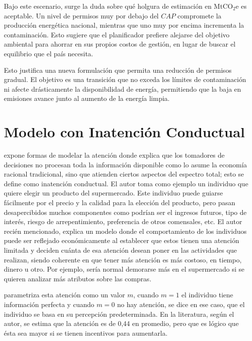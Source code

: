 Bajo este escenario, surge la duda sobre qué holgura de estimación en MtCO$_2$e  es aceptable. Un nivel de permisos muy por debajo del $CAP$ compromete la producción energética nacional, mientras que uno muy por encima incrementa la contaminación. Esto sugiere que el planificador prefiere alejarse del objetivo ambiental para ahorrar en sus propios costos de gestión, en lugar de buscar el equilibrio que el país necesita. \medskip

Esto justifica una nueva formulación que permita una reducción de permisos gradual. El objetivo es una transición que no exceda los límites de contaminación ni afecte drásticamente la disponibilidad de energía, permitiendo que la baja en emisiones avance junto al aumento de la energía limpia.\medskip

\section{Modelo con Inatención Conductual}
\label{atencionconductual}
 expone formas de modelar la atención donde explica que los tomadores de decisiones no procesan toda la información disponible como lo asume la economía racional tradicional, sino que atienden ciertos aspectos del espectro total; esto se define como inatención conductual. El autor toma como ejemplo un individuo que quiere elegir un producto del supermercado. Este individuo puede guiarse fácilmente por el precio y la calidad para la elección del producto, pero pasan desapercibidos muchos componentes como podrían ser el ingresos futuros, tipo de interés, riesgo de arrepentimiento, preferencia de otros comensales, etc. El autor recién mencionado, explica un modelo donde el comportamiento de los individuos puede ser reflejado económicamente al establecer que estos tienen una atención limitada y deciden cuánta de esa atención desean poner en las actividades que realizan, siendo coherente en que tener más atención es más costoso, en tiempo, dinero u otro. Por ejemplo, sería normal demorarse más en el supermercado si se quieren analizar más atributos sobre las compras.\medskip

 parametriza esta atención como un valor $m$, cuando $m=1$ el individuo tiene información perfecta y cuando $m=0$ no hay atención, se dice en ese caso, que el individuo se basa en su percepción predeterminada. En la literatura, según el autor, se estima que la atención es de 0,44 en promedio, pero que es lógico que ésta sea mayor si se tienen incentivos para aumentarla.\medskip

